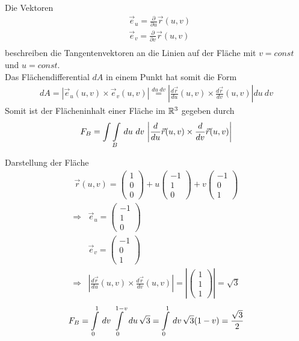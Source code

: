 Die Vektoren
\begin{align*}
&\vec{e}_u = \frac{\partial}{\partial u} \vec{r}(u,v)\\
&\vec{e}_v = \frac{\partial}{\partial v} \vec{r}(u,v)\\
\end{align*}
beschreiben die Tangentenvektoren an die Linien auf der Fläche mit $v=const$
und $u=const$.\\
Das Flächendifferential $dA$ in einem Punkt hat somit die Form
\begin{align*}
dA = |\vec{e}_u(u,v) \times \vec{e}_v(u,v)| \overset{du\ dv}{=}
\left|\frac{d\vec{r}}{du}(u,v) \times \frac{d\vec{r}}{dv}(u,v)\right|du\ dv
\end{align*}
Somit ist der Flächeninhalt einer Fläche im $\mathbb{R}^3$ gegeben durch
\begin{align*}
F_B = \int \int \limits_{B} \,du\, \,dv\, \left|\frac{d}{du}\vec{r}(u,v) \times
\frac{d}{dv}\vec{r}(u,v)\right|
\end{align*}
\begin{Beispiel}{Darstellung der Fläche}
\begin{align*}
\vec{r}(u,v) = \begin{pmatrix}1\\0\\0\end{pmatrix} + u
\begin{pmatrix}-1\\1\\0\end{pmatrix} + v \begin{pmatrix}-1\\0\\1\end{pmatrix}
\end{align*}
\begin{align*}
\Rightarrow & \vec{e}_u = \begin{pmatrix}-1\\1\\0\end{pmatrix}\\
& \vec{e}_v = \begin{pmatrix}-1\\0\\1\end{pmatrix}\\
\Rightarrow & \left|\frac{d\vec{r}}{du}(u,v) \times
\frac{d\vec{r}}{dv}(u,v)\right| =
\left|\begin{pmatrix}1\\1\\1\end{pmatrix}\right| =
\sqrt{3}
\end{align*}
\begin{align*}
F_B = \int \limits_{0}^{1} \,dv\, \int \limits_{0}^{1-v} \,du\, \sqrt{3} = \int
\limits_{0}^{1} \,dv\, \sqrt{3}(1-v) = \frac{\sqrt{3}}{2}
\end{align*}
\end{Beispiel}
